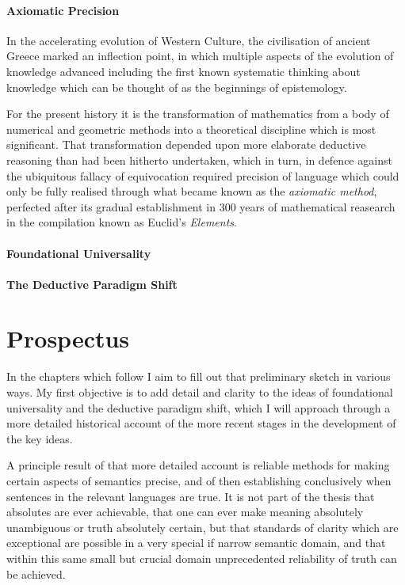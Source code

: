 \documentclass[10pt,titlepage]{book}
\begin{document}
\paragraph{Axiomatic Precision}

In the accelerating evolution of Western Culture, the civilisation of ancient Greece marked an inflection point, in which multiple aspects of the evolution of knowledge advanced including the first known systematic thinking about knowledge which can be thought of as the beginnings of epistemology.

For the present history it is the transformation of mathematics from a body of numerical and geometric methods into a theoretical discipline which is most significant.
That transformation depended upon more elaborate deductive reasoning than had been hitherto undertaken, which in turn, in defence against the ubiquitous fallacy of equivocation required precision of language which could only be fully realised through what became known as the \emph{axiomatic method}, perfected after its gradual establishment in 300 years of mathematical reasearch in the compilation known as Euclid's \emph{Elements}\cite{euclidEL1}.

\paragraph{Foundational Universality}

\paragraph{The Deductive Paradigm Shift}

\section{Prospectus}

In the chapters which follow I aim to fill out that preliminary sketch in various ways.
My first objective is to add detail and clarity to the ideas of foundational universality and the deductive paradigm shift, which I will approach through a more detailed historical account of the more recent stages in the development of the key ideas.

A principle result of that more detailed account is reliable methods for making certain aspects of semantics precise, and of then establishing conclusively when sentences in the relevant languages are true.
It is not part of the thesis that absolutes are ever achievable, that one can ever make meaning absolutely unambiguous or truth absolutely certain, but that standards of clarity which are exceptional are possible in a very special if narrow semantic domain, and that within this same small but crucial domain unprecedented reliability of truth can be achieved.
\end{document}
